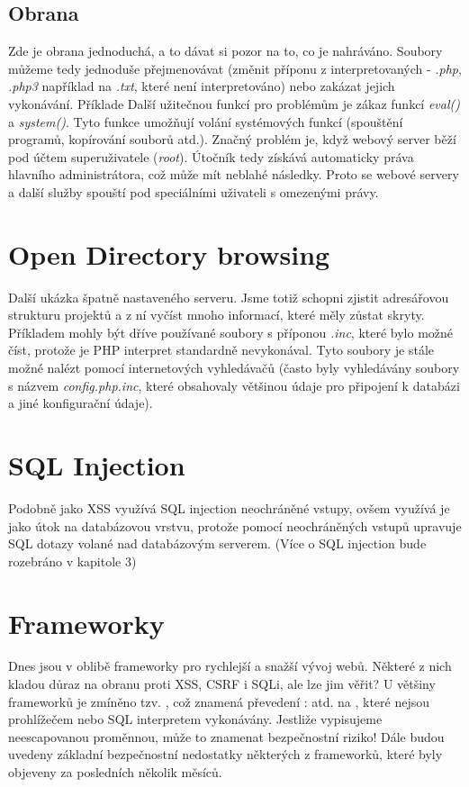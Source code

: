 \documentclass[12pt, a4paper]{report}
\begin{document}
\subsection{Obrana}
Zde je obrana jednoduchá, a to dávat si pozor na to, co je nahráváno. Soubory můžeme tedy jednoduše přejmenovávat (změnit příponu z interpretovaných - \textit{.php}, \textit{.php3}  například na \textit{.txt}, které není interpretováno) nebo zakázat jejich vykonávání. Příklade Další užitečnou funkcí pro  problémům je zákaz funkcí \textit{eval()} a \textit{system()}. Tyto funkce umožňují volání systémových funkcí (spouštění programů, kopírování souborů atd.). Značný problém je, když webový server běží pod účtem superuživatele (\textit{root}). Útočník tedy získává automaticky práva hlavního administrátora, což může mít neblahé následky. Proto se webové servery a další služby spouští pod speciálními uživateli s omezenými právy.

\section{Open Directory browsing}
Další ukázka špatně nastaveného serveru. Jsme totiž schopni zjistit adresářovou strukturu projektů a z ní vyčíst mnoho informací, které měly zůstat skryty. Příkladem mohly být dříve používané soubory s příponou \textit{.inc}, které bylo možné číst, protože je PHP interpret standardně nevykonával. Tyto soubory je stále možné nalézt pomocí internetových vyhledávačů (často byly vyhledávány soubory s názvem \textit{config.php.inc}, které obsahovaly většinou údaje pro připojení k databázi a jiné konfigurační údaje).

\section{SQL Injection}
Podobně jako XSS využívá SQL injection neochráněné vstupy, ovšem využívá je jako útok na databázovou vrstvu, protože pomocí neochráněných vstupů upravuje SQL dotazy volané nad databázovým serverem. (Více o SQL injection bude rozebráno v kapitole 3)

\section{Frameworky}
Dnes jsou v oblibě frameworky pro rychlejší a snažší vývoj webů. Některé z nich kladou důraz na obranu proti XSS, CSRF i SQLi, ale lze jim věřit? U většiny frameworků je zmíněno tzv. , což znamená převedení : \uv{<>\"} atd. na , které nejsou prohlížečem nebo SQL interpretem vykonávány. Jestliže vypisujeme neescapovanou proměnnou, může to znamenat bezpečnostní riziko! Dále budou uvedeny základní bezpečnostní nedostatky některých z frameworků, které byly objeveny za posledních několik měsíců.
\end{document}
